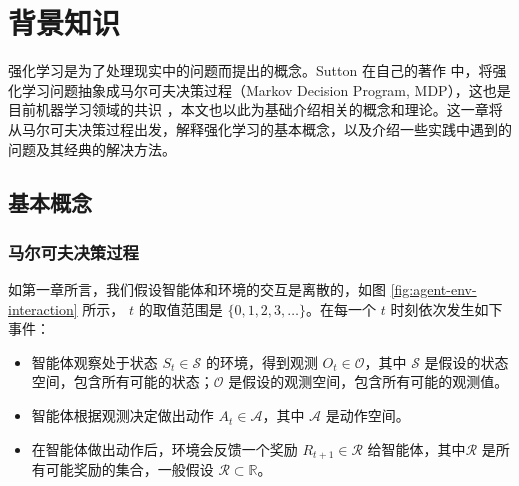 
\chapter{背景知识}
\label{cha:background-knowledge}

强化学习是为了处理现实中的问题而提出的概念。Sutton 在自己的著作 \cite{suttonReinforcementLearningIntroduction2018}中，将强化学习问题抽象成马尔可夫决策过程（Markov Decision Program, MDP），这也是目前机器学习领域的共识 \cite{mnihHumanlevelControlDeep2015} \cite{mnihAsynchronousMethodsDeep2016} \cite{hesselRainbowCombiningImprovements2018}  ，本文也以此为基础介绍相关的概念和理论。这一章将从马尔可夫决策过程出发，解释强化学习的基本概念，以及介绍一些实践中遇到的问题及其经典的解决方法。

\section{基本概念}
\subsection{马尔可夫决策过程}

如第一章所言，我们假设智能体和环境的交互是离散的，如图 \ref{fig:agent-env-interaction} 所示， $t$ 的取值范围是 $\{0, 1, 2,3, \dots\}$。在每一个 $t$ 时刻依次发生如下事件：
\begin{itemize}
    \item 智能体观察处于状态 $S_t \in \mathcal{S}$ 的环境，得到观测 $O_t \in \mathcal{O}$，其中 $\mathcal{S}$ 是假设的状态空间，包含所有可能的状态；$\mathcal{O}$ 是假设的观测空间，包含所有可能的观测值。
    \item 智能体根据观测决定做出动作 $A_t \in \mathcal{A}$，其中 $\mathcal{A}$ 是动作空间。
    \item 在智能体做出动作后，环境会反馈一个奖励 $R_{t+1} \in \mathcal{R}$ 给智能体，其中$\mathcal{R}$ 是所有可能奖励的集合，一般假设 $\mathcal{R} \subset \mathbb{R}$。
\end{itemize}

